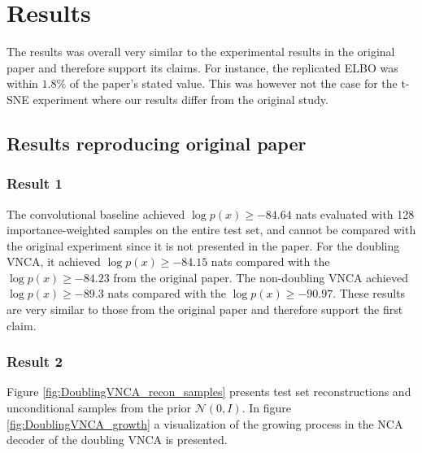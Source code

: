 \section{Results}
\label{sec:results}
The results was overall very similar to the experimental results in the original paper and therefore support its claims. For instance, the replicated ELBO was within $1.8\%$ of the paper's stated value. This was however not the case for the t-SNE experiment where our results differ from the original study.

\subsection{Results reproducing original paper}
\subsubsection{Result 1}

 The convolutional baseline achieved $\log p(x) \geq -84.64$ nats evaluated with 128 importance-weighted samples on the entire test set, and cannot be compared with the original experiment since it is not presented in the paper. For the doubling VNCA, it achieved $\log p(x) \geq -84.15$ nats compared with the $\log p(x) \geq -84.23$ from the original paper. The non-doubling VNCA achieved $\log p(x) \geq -89.3$ nats compared with the $\log p(x) \geq -90.97$. These results are very similar to those from the original paper and therefore support the first claim.

\subsubsection{Result 2}
Figure \ref{fig:DoublingVNCA_recon_samples} presents test set reconstructions and unconditional samples from the prior $\mathcal{N}(0, I)$. In figure \ref{fig:DoublingVNCA_growth} a visualization of the growing process in the NCA decoder of the doubling VNCA is presented. 

